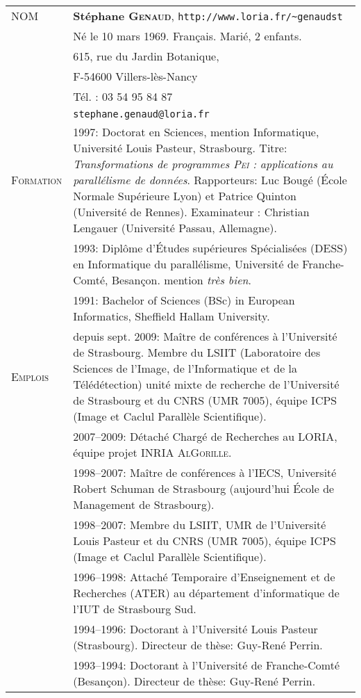 
\setlength{\tabcolsep}{5pt}
\noindent
\begin{tabular}{lp{13.7cm}}
\textsc{NOM}		&{\bf Stéphane \textsc{Genaud}}, \texttt{{http://}www.loria.fr/\~{}genaudst}\\
				& Né le 10 mars 1969. Français. Marié, 2 enfants. \\
				  & 615, rue du Jardin Botanique,\\
				  & F-54600 Villers-lès-Nancy\\
				  & Tél. : 03 54 95 84 87\\ 
				 & \texttt{stephane.genaud@loria.fr}\\[5mm]

\textsc{Formation}	& 1997:  Doctorat en Sciences, mention Informatique, Université Louis Pasteur, Strasbourg.
      			  Titre: {\em Transformations de programmes \textsc{Pei} : applications au parall\'{e}lisme de donn\'{e}es}.
		              Rapporteurs: Luc Bougé (\'{E}cole Normale Supérieure Lyon) et Patrice Quinton (Université de Rennes). Examinateur : Christian Lengauer (Université Passau, Allemagne).\\[2mm]
			      & 1993: Diplôme d'\'{E}tudes supérieures Spécialisées (DESS) en Informatique du parallélisme, 
				  Université de Franche-Comté, Besançon. mention {\em très bien}.\\[2mm]
				& 1991: Bachelor of Sciences (BSc) in European Informatics, Sheffield Hallam University.\\[5mm]


\textsc{Emplois} 		& depuis sept. 2009: Maître de conférences à l'Université de Strasbourg. Membre du LSIIT (Laboratoire des Sciences de l'Image, de l'Informatique et de la Télédétection) unité mixte de recherche de l'Université de Strasbourg et du CNRS (UMR 7005),
équipe ICPS (Image et Caclul Parallèle Scientifique).\\[2mm]
 	                  & 2007--2009: Détaché Chargé de Recherches au LORIA, équipe projet 
				  INRIA \textsc{AlGorille}.\\[2mm]

				& 1998--2007: Maître de conférences à l'IECS, Université Robert Schuman de Strasbourg (aujourd'hui \'{E}cole de Management de Strasbourg).\\[2mm]
				& 1998--2007: Membre du LSIIT, UMR de l'Université Louis Pasteur et du CNRS (UMR 7005), 
équipe ICPS (Image et Caclul Parallèle Scientifique).\\[2mm]
				& 1996--1998: Attaché Temporaire d'Enseignement et de Recherches (ATER) au département d'informatique 
de l'IUT de Strasbourg Sud.\\[2mm]
				& 1994--1996: Doctorant à l'Université Louis Pasteur (Strasbourg). Directeur de thèse: Guy-René Perrin.\\[2mm]
				& 1993--1994: Doctorant à l'Université de Franche-Comté (Besançon). Directeur de thèse: Guy-René Perrin.\\[5mm]



\end{tabular}
